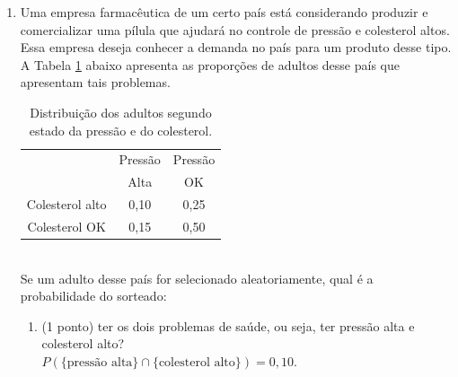 \documentclass{article}
\begin{document}
\begin{enumerate}
\begin{enumerate}
{	Os salários das mulheres ordenado é: 5,5,10,10,10,10,10,10,15 e 15.\\ 
	O salário médio das mulheres é $\frac{100}{10} = 10$. O salário mediano das mulheres é $\frac{10 + 10}{2} = 10$. O salário modal das mulheres é 10.	
	}
	
	\item (1 ponto) A variância dos salários anuais observados na amostra.\\{
	\color{blue}
	A variância do salário dos homens é:
	$$
	\frac{3(10-15)^2 + 4(15-15)^2 + 3(20-15)^2}{10}
	= \frac{3 \cdot 25 + 3\cdot 25}{10}
	= \frac{150}{10} = 15.
	$$
	A variância do salário das mulheres é:
	$$
	\frac{2 \cdot (5-10)^2 + 6 \cdot (10-10)^2 + 2 \cdot (15-10)^2}{10}
	= \frac{2 \cdot 25 + 2\cdot 25}{10}
	= \frac{100}{10} = 10.
	$$	
	}
	
	\item (1 ponto) Interprete os valores obtidos nos itens anteriores.\\{
	\color{blue}
	Os homens ganham em média 5 salários mínimos a mais que as mulheres. Os salários mediano e modal dos homens também são mais altos que os valores correspondentes para as mulheres. A variabilidade dos salários das mulheres é menor do que a variabilidade do salário dos homens.	
	}
	
\end{enumerate}


\item Uma empresa farmacêutica de um certo país está considerando produzir e comercializar uma pílula que ajudará no controle de pressão e colesterol altos. 
Essa empresa deseja conhecer a demanda no país para um produto desse tipo. 
A Tabela \ref{t:pressao_colesterol} abaixo apresenta as proporções de adultos desse país que apresentam tais problemas.
\begin{table}[htp]
\centering
\caption{Distribuição dos adultos segundo estado da pressão e do colesterol.}
\begin{tabular}{c|cc}
\hline
  & Pressão & Pressão  \\
 & Alta & OK \\
\hline
Colesterol alto & 0,10 & 0,25 \\
Colesterol OK   & 0,15 & 0,50 \\
\hline
\end{tabular}
\label{t:pressao_colesterol}
\end{table}\\
Se um adulto desse país for selecionado aleatoriamente, qual é a probabilidade do sorteado:
\begin{enumerate}
	\item (1 ponto) ter os dois problemas de saúde, ou seja, ter pressão alta e colesterol alto?\\{
	\color{blue}
	$P(\{\text{pressão alta}\} \cap \{\text{colesterol alto}\}) = 0,10$.
	}
	

\end{enumerate}
\end{enumerate}
\end{document}
